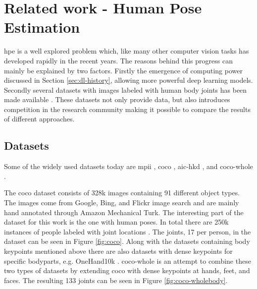 \chapter{Related work - Human Pose Estimation} \label{sec:pose_estimation}
\gls{hpe} is a well explored problem which, like many other computer vision tasks has developed rapidly in the recent years. The reasons behind this progress can mainly be explained by two factors. Firstly the emergence of computing power discussed in Section \ref{sec:dl-history}, allowing more powerful deep learning models. Secondly several datasets with images labeled with human body joints has been made available \cite{Chen2020}. These datasets not only provide data, but also introduces competition in the research community making it possible to compare the results of different approaches.

\section{Datasets} \label{sec:datasets}
Some of the widely used datasets today are \gls{mpii} \cite{Andriluka2014}, \gls{coco} \cite{Lin2014}, \gls{aic-hkd} \cite{Wu2017}, and \gls{coco-whole} \cite{Jin2020}.%

The \gls{coco} dataset consists of 328k images containing 91 different object types. The images come from Google, Bing, and Flickr image search and are mainly hand annotated through Amazon  Mechanical Turk. The interesting part of the dataset for this work is the one with human poses. In total there are 250k instances of people labeled with joint locations \cite{Lin2014}. The joints, 17 per person, in the dataset can be seen in Figure \ref{fig:coco}. Along with the datasets containing body keypoints mentioned above there are also datasets with dense keypoints for specific bodyparts, e.g. OneHand10k \cite{Wang2019}. \gls{coco-whole} is an attempt to combine these two types of datasets by extending \gls{coco} with dense keypoints at hands, feet, and faces. The resulting 133 joints can be seen in Figure \ref{fig:coco-wholebody}.

